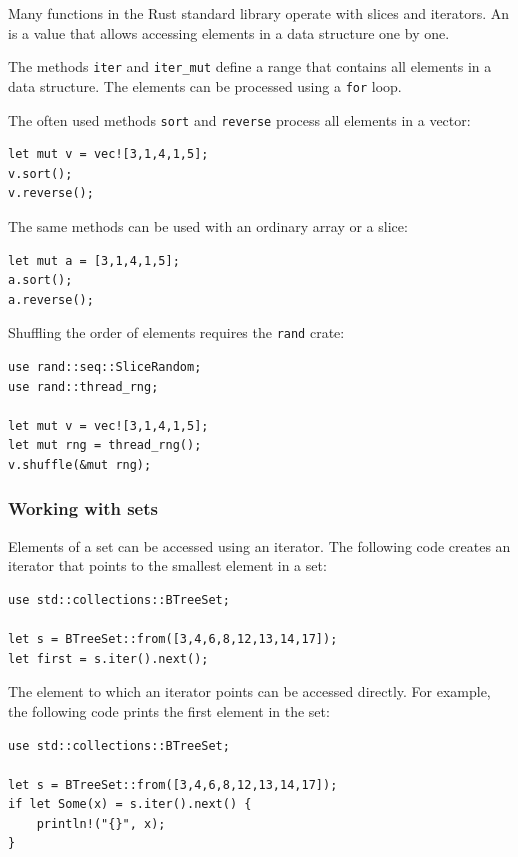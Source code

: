 Many functions in the Rust standard library
operate with slices and iterators.
An  is a value that allows
accessing elements in a data structure one by one.

The methods \texttt{iter} and \texttt{iter\_mut}
define a range that contains
all elements in a data structure.
The elements can be processed using a \texttt{for} loop.

The often used methods \texttt{sort}
and \texttt{reverse} process all elements
in a vector:

\begin{lstlisting}
let mut v = vec![3,1,4,1,5];
v.sort();
v.reverse();
\end{lstlisting}

The same methods can be used with an ordinary array
or a slice:

\begin{lstlisting}
let mut a = [3,1,4,1,5];
a.sort();
a.reverse();
\end{lstlisting}

Shuffling the order of elements
requires the \texttt{rand} crate:

\begin{lstlisting}
use rand::seq::SliceRandom;
use rand::thread_rng;

let mut v = vec![3,1,4,1,5];
let mut rng = thread_rng();
v.shuffle(&mut rng);
\end{lstlisting}

\subsubsection{Working with sets}

Elements of a set can be accessed
using an iterator.
The following code creates an iterator
that points to the smallest element in a set:

\begin{lstlisting}
use std::collections::BTreeSet;

let s = BTreeSet::from([3,4,6,8,12,13,14,17]);
let first = s.iter().next();
\end{lstlisting}

The element to which an iterator points
can be accessed directly.
For example, the following code prints
the first element in the set:

\begin{lstlisting}
use std::collections::BTreeSet;

let s = BTreeSet::from([3,4,6,8,12,13,14,17]);
if let Some(x) = s.iter().next() {
    println!("{}", x);
}
\end{lstlisting}

